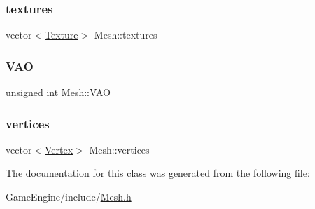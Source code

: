 \mbox{\label{class_mesh_a09bf4e8307bf7717c56501ca6293c6c0}} 
\subsubsection{\texorpdfstring{textures}{textures}}
{\footnotesize\ttfamily vector$<$\mbox{\hyperlink{struct_texture}{Texture}}$>$ Mesh\+::textures}

\mbox{\label{class_mesh_a79afa055e485fb65b1a7aa5b8eda2940}} 
\subsubsection{\texorpdfstring{V\+AO}{VAO}}
{\footnotesize\ttfamily unsigned int Mesh\+::\+V\+AO}

\mbox{\label{class_mesh_abe5c05c224e47ba1e8b6393759798a9b}} 
\subsubsection{\texorpdfstring{vertices}{vertices}}
{\footnotesize\ttfamily vector$<$\mbox{\hyperlink{struct_vertex}{Vertex}}$>$ Mesh\+::vertices}



The documentation for this class was generated from the following file\+:\begin{DoxyCompactItemize}
\item 
Game\+Engine/include/\mbox{\hyperlink{_mesh_8h}{Mesh.\+h}}\end{DoxyCompactItemize}
